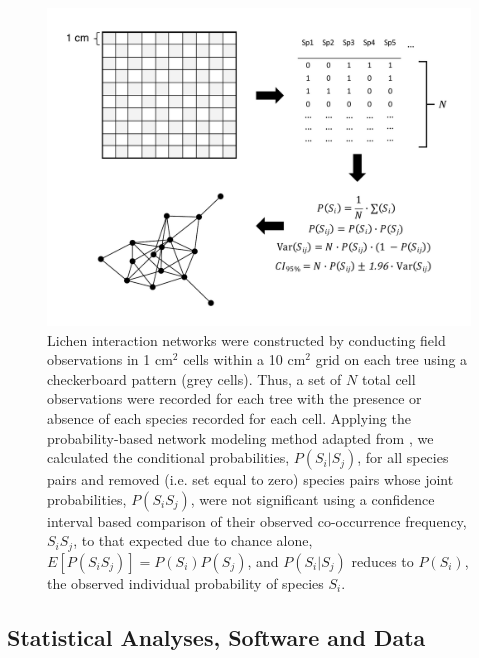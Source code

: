 \documentclass[9pt,twocolumn,twoside,lineno]{pnas-new}
\begin{document}
{\begin{figure}[ht]
\centering
\includegraphics[width=\linewidth]{lcn_araujo_method.pdf}
\caption{Lichen interaction networks were constructed by conducting
  field observations in 1 cm$^2$ cells within a 10 cm$^2$ grid on each
  tree using a checkerboard pattern (grey cells). Thus, a set of $N$
  total cell observations were recorded for each tree with the
  presence or absence of each species recorded for each cell. Applying
  the probability-based network modeling method adapted from
  \cite{Araujo2011}, we calculated the conditional probabilities,
  $P(S_i|S_j)$, for all species pairs and removed (i.e. set equal to
  zero) species pairs whose joint probabilities, $P(S_i S_j)$, were
  not significant using a confidence interval based comparison of
  their observed co-occurrence frequency, $S_iS_j$, to that expected
  due to chance alone, $E[P(S_iS_j)] = P(S_i) P(S_j)$, and
  $P(S_i|S_j)$ reduces to $P(S_i)$, the observed individual
  probability of species $S_i$.}
\label{fig:conet_method}
\end{figure}



\subsection*{Statistical Analyses, Software and Data}

}
\end{document}
